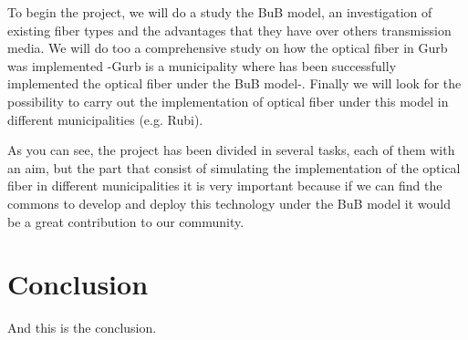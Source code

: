 \documentclass[draftclsnofoot,12pt,journal,onecolumn]{IEEEtran}
\begin{document}
To begin the project, we will do a study the BuB model, an investigation of existing fiber types and the advantages that they have over others transmission media. We will do too a comprehensive study on how the optical fiber in Gurb was implemented -Gurb is a municipality where has been successfully implemented the optical fiber under the BuB model-. Finally we will look for the possibility to carry out the implementation of optical fiber under this model in different municipalities (e.g. Rubi).

As you can see, the project has been divided in several tasks, each of them with an aim, but the part that consist of simulating the implementation of the optical fiber in different municipalities it is very important because if we can find the commons to develop and deploy this technology under the BuB model it would be a great contribution to our community.
\section{Conclusion}
\label{sec:conclusion}
And this is the conclusion.





%


\end{document}
